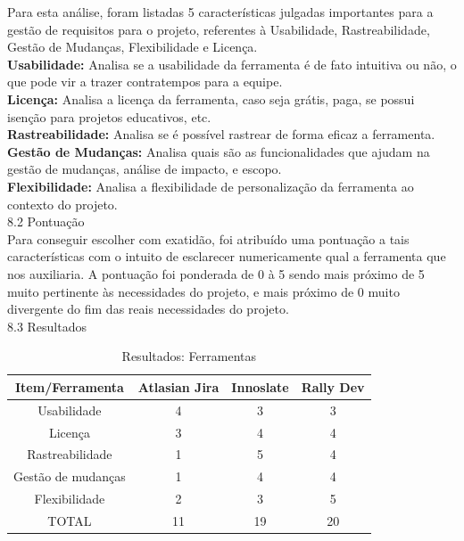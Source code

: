 \tab Para esta análise, foram listadas 5 características julgadas importantes para a gestão de requisitos para o projeto, referentes à Usabilidade, Rastreabilidade, Gestão de Mudanças, Flexibilidade e Licença.\\
\tab \textbf{Usabilidade:} Analisa se a usabilidade da ferramenta é de fato intuitiva ou não, o que pode vir a trazer contratempos para a equipe.\\
\tab \textbf{Licença:} Analisa a licença da ferramenta, caso seja grátis, paga, se possui isenção para projetos educativos, etc.\\
\tab \textbf{Rastreabilidade:} Analisa se é possível rastrear de forma eficaz a ferramenta.\\
\tab \textbf{Gestão de Mudanças:} Analisa quais são as funcionalidades que ajudam na gestão de mudanças, análise de impacto, e escopo.\\
\tab \textbf{Flexibilidade:} Analisa a flexibilidade de personalização da ferramenta ao contexto do projeto.\\

{\large{8.2 Pontuação}}\\

\tab Para conseguir escolher com exatidão, foi atribuído uma pontuação a tais características com o intuito de esclarecer numericamente qual a ferramenta que nos auxiliaria. A pontuação foi ponderada de 0 à 5 sendo mais próximo de 5 muito pertinente às necessidades do projeto, e mais próximo de 0 muito divergente do fim das reais necessidades do projeto.\\

{\large{8.3 Resultados}}\\

\begin{longtable}{  c c c c }
\caption{Resultados: Ferramentas}\\
\toprule
Item/Ferramenta & Atlasian Jira  & Innoslate & Rally Dev \\ \midrule
\rowcolor[gray]{0.9}
Usabilidade & 4 & 3 & 3 \\
Licença & 3 & 4 & 4 \\
\rowcolor[gray]{0.9}
Rastreabilidade & 1 & 5 & 4 \\
Gestão de mudanças & 1 & 4 & 4 \\
\rowcolor[gray]{0.9}
Flexibilidade & 2 & 3 & 5  \\
TOTAL & 11 & 19 & 20 \\ \bottomrule

\end{longtable}

